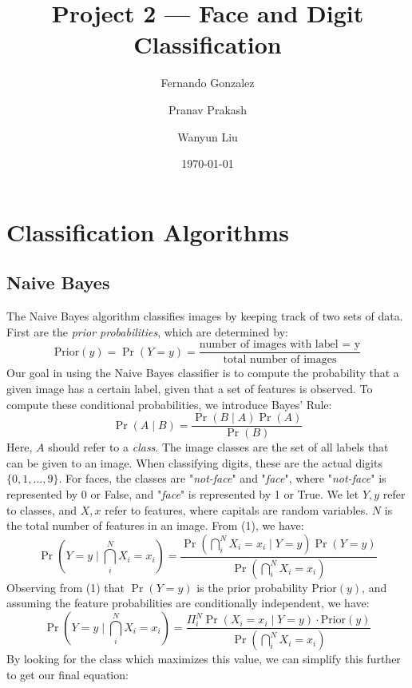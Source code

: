 \documentclass{article}
\title{Project 2 --- Face and Digit Classification}
\author{Fernando Gonzalez}
\author{Pranav Prakash}
\author{Wanyun Liu}
\affil{\textit {\{fdg17, pp618, wl432\}@scarletmail.rutgers.edu}}
\date{\today}
\begin{document}
  \maketitle
  \section{Classification Algorithms}
  \subsection{Naive Bayes}
  The Naive Bayes algorithm classifies images by keeping track of two sets of data.
  First are the {\em prior probabilities}, which are determined by:
  \begin{equation}
  \text{Prior}(y) = \Pr(Y = y) = \frac{\text{number of images with label = y}}{\text{total number of images}}
  \end{equation}
  Our goal in using the Naive Bayes classifier is to compute the probability that a given image has a certain label,
  given that a set of features is observed. To compute these conditional probabilities, we introduce Bayes' Rule:
  \begin{equation}
  \Pr(A \mid B) = \frac{\Pr(B \mid A)\Pr(A)}{\Pr(B)}
  \end{equation}
  Here, $A$ should refer to a {\em class}. The image classes are the set of all labels that can be given to an image.
  When classifying digits, these are the actual digits $\{0, 1, \ldots, 9\}$. For faces, the classes are "{\em not-face}" and "{\em face}",
  where "{\em not-face}" is represented by 0 or False, and "{\em face}" is represented by 1 or True.
  We let $Y, y$ refer to classes, and $X, x$ refer to features, where capitals are random variables. $N$ is the total number of features in an image.
  From (1), we have:
  \begin{equation}
  \Pr(Y = y \mid \bigcap_i^NX_i = x_i) = \frac{\Pr(\bigcap_i^NX_i = x_i \mid Y = y)\Pr(Y = y)}{\Pr(\bigcap_i^NX_i = x_i)}
  \end{equation}
  Observing from (1) that $\Pr(Y = y)$ is the prior probability $\text{Prior}(y)$, and assuming the feature probabilities are conditionally independent, we have:
  \begin{equation}
  \Pr(Y = y \mid \bigcap_i^NX_i = x_i) = \frac{\Pi_i^N\Pr(X_i = x_i \mid Y = y) \cdot \text{Prior}(y)}{\Pr(\bigcap_i^NX_i = x_i)}
  \end{equation}
  By looking for the class which maximizes this value, we can simplify this further to get our final equation:
\end{document}
